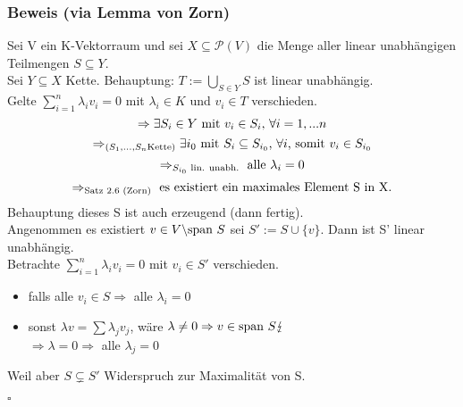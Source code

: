 \documentclass[a4paper,twoside]{article}
\newcommand{\tn}[1]{\textnormal {#1}}
\begin{document}
\subsubsection*{Beweis (via Lemma von Zorn)}
Sei V ein K-Vektorraum und sei $X \subseteq \mathcal P(V)$ die Menge aller linear unabhängigen Teilmengen $S \subseteq Y$. \\
Sei $Y\subseteq X$ Kette. Behauptung: $T:=\bigcup_{S\in Y} S$ ist linear unabhängig. \\
Gelte $\sum_{i=1}^n \lambda_i v_i = 0$ mit $\lambda_i \in K$ und $v_i \in T$ verschieden. \\
$$\Rightarrow \exists S_i \in Y\tn{ mit }v_i \in S_i\tn{, }\forall i=1,...n$$
$$\Rightarrow_{\tn(S_1,...,S_n \tn{Kette)}} \exists i_0\tn{ mit }S_i \subseteq S_{i_0}\tn{, } \forall i\tn{, somit }v_i \in S_{i_0}$$
$$\Rightarrow_{S_{i_0}\tn{ lin. unabh.}}\tn{ alle }\lambda_i=0$$
$$\Rightarrow_{\tn{Satz 2.6 (Zorn)}}\tn{ es existiert ein maximales Element S in X.}$$
Behauptung dieses S ist auch erzeugend (dann fertig).\\
Angenommen es existiert $v\in V\backslash\tn{span }S$ sei $S':= S\cup \{v\}$. Dann ist S' linear unabhängig.\\
Betrachte $\sum_{i=1}^n\lambda_iv_i=0$ mit $v_i\in S'$ verschieden.
\begin{itemize}
\item falls alle $v_i\in S \Rightarrow$ alle $\lambda_i = 0$
\item sonst $\lambda v = \sum \lambda_j v_j$, wäre $\lambda \neq 0 \Rightarrow v\in \tn{span }S \lightning$\\
$\Rightarrow \lambda = 0 \Rightarrow$ alle $\lambda_j=0$
\end{itemize}
Weil aber $S\subsetneq S'$ Widerspruch zur Maximalität von S.
\begin{flushright}
$\square$\\
\end{flushright}
\end{document}
